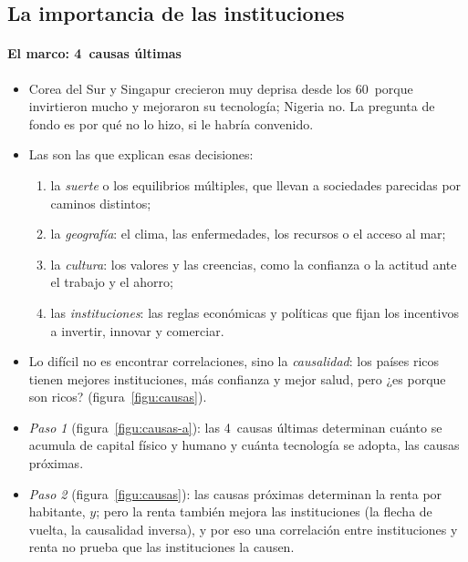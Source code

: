 \documentclass[11pt]{article}
\begin{document}
\subsection{La importancia de las instituciones}\label{sec:instituciones}
\paragraph{El marco: 4~causas últimas}

\begin{itemize}
\item Corea del Sur y Singapur crecieron muy deprisa desde los 60~porque invirtieron mucho y mejoraron su tecnología; Nigeria no. La pregunta de fondo es por qué no lo hizo, si le habría convenido.
\item Las  son las que explican esas decisiones\nocite{Acemoglu2009}:
  \begin{enumerate}
  \item la \emph{suerte} o los equilibrios múltiples, que llevan a sociedades parecidas por caminos distintos;
  \item la \emph{geografía}: el clima, las enfermedades, los recursos o el acceso al mar;
  \item la \emph{cultura}: los valores y las creencias, como la confianza o la actitud ante el trabajo y el ahorro;
  \item las \emph{instituciones}: las reglas económicas y políticas que fijan los incentivos a invertir, innovar y comerciar.
  \end{enumerate}
\item Lo difícil no es encontrar correlaciones, sino la \emph{causalidad}: los países ricos tienen mejores instituciones, más confianza y mejor salud, pero ¿es porque son ricos? (figura~\ref{figu:causas}).
\end{itemize}
\begin{infografia}[H]
\centering
\caption{De las causas últimas a las próximas y a la renta por habitante (a): las causas últimas y las próximas}\label{figu:causas-a}
\end{infografia}

\begin{itemize}
\item \emph{Paso 1} (figura~\ref{figu:causas-a}): las 4~causas últimas determinan cuánto se acumula de capital físico y humano y cuánta tecnología se adopta, las causas próximas.
\item \emph{Paso 2} (figura~\ref{figu:causas}): las causas próximas determinan la renta por habitante, $y$; pero la renta también mejora las instituciones (la flecha de vuelta, la causalidad inversa), y por eso una correlación entre instituciones y renta no prueba que las instituciones la causen.
\end{itemize}
\end{document}
